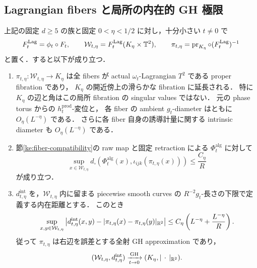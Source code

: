 \subsection{Lagrangian fibers と局所の内在的 GH 極限}

\begin{theorem}
\label{ke:open-cell-collapse}
上記の固定 $d\ge5$ の族と固定 $0<\eta<1/2$ に対し，十分小さい $t\ne0$ で
\[
 F_t^{\mathrm{Lag}}=\phi_t\circ F_t,
 \qquad \mathcal W_{t,\eta}=F_t^{\mathrm{Lag}}(K_\eta\times\mathbb T^2),
 \qquad
 \pi_{t,\eta}=\operatorname{pr}_{K_\eta}\circ(F_t^{\mathrm{Lag}})^{-1}
\]
と置く．すると以下が成り立つ．
\begin{enumerate}
\item
$\pi_{t,\eta}:\mathcal W_{t,\eta}\to K_\eta$ は全 fibers が
actual $\omega_t$-Lagrangian $T^2$ である proper fibration であり，
$K_\eta$ の開近傍上の滑らかな fibration に延長される．
特に $K_\eta$ の辺と角はこの局所 fibration の singular values ではない．
元の phase torus からの $h_t^{\mathrm{prod}}$-変位と，
各 fiber の ambient $g_t$-diameter はともに $O_\eta(L^{-\eta})$ である．
さらに各 fiber 自身の誘導計量に関する intrinsic diameter も
$O_\eta(L^{-\eta})$ である．

\item
節\ref{ke:fiber-compatibility}の raw map と固定 retraction による
$\Phi_t^{\mathrm{alg}}$ に対して
\begin{equation}\label{ke:eq:open-raw-compatibility}
 \sup_{x\in\mathcal W_{t,\eta}}
 d_\square\left(\Phi_t^{\mathrm{alg}}(x),
               \iota_{ijk}(\pi_{t,\eta}(x))\right)
 \le\frac{C_\eta}{R}
\end{equation}
が成り立つ．

\item
$d_{t,\eta}^{\mathrm{int}}$ を，$\mathcal W_{t,\eta}$ 内に留まる
piecewise smooth curves の $R^{-2}g_t$-長さの下限で定義する内在距離とする．
このとき
\begin{equation}\label{ke:eq:open-gh-distortion}
 \sup_{x,y\in\mathcal W_{t,\eta}}
 \left|d_{t,\eta}^{\mathrm{int}}(x,y)
       -|\pi_{t,\eta}(x)-\pi_{t,\eta}(y)|_{\mathbb R^2}\right|
 \le C_\eta\left(L^{-\eta}+\frac{L^{-\eta}}R\right).
\end{equation}
従って $\pi_{t,\eta}$ は右辺を誤差とする全射 GH approximation であり，
\begin{equation}\label{ke:eq:open-gh-limit}
 (\mathcal W_{t,\eta},d_{t,\eta}^{\mathrm{int}})
 \xrightarrow[t\to0]{\mathrm{GH}}
 (K_\eta,|\,\cdot\,|_{\mathbb R^2}).
\end{equation}
\end{enumerate}
\end{theorem}
